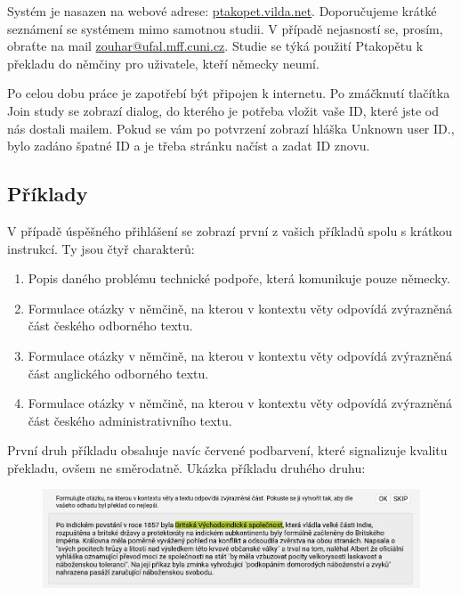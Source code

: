 Systém je nasazen na webové adrese: \href{https://ptakopet.vilda.net/}{ptakopet.vilda.net}. Doporučujeme krátké seznámení se systémem mimo samotnou studii. V případě nejasností se, prosím, obraťte na mail \href{mailto:zouhar@ufal.mff.cuni.cz}{zouhar@ufal.mff.cuni.cz}. Studie se týká použití Ptakopětu k překladu do němčiny pro uživatele, kteří německy neumí.

Po celou dobu práce je zapotřebí být připojen k internetu. Po zmáčknutí tlačítka Join study se zobrazí dialog, do kterého je potřeba vložit vaše ID, které jste od nás dostali mailem. Pokud se vám po potvrzení zobrazí hláška Unknown user ID., bylo zadáno špatné ID a je třeba stránku načíst a zadat ID znovu.

\pagebreak

\subsection*{Příklady}

V případě úspěšného přihlášení se zobrazí první z vašich příkladů spolu s krátkou instrukcí. Ty jsou čtyř charakterů:

\begin{enumerate}
    \item Popis daného problému technické podpoře, která komunikuje pouze německy.
    \item Formulace otázky v němčině, na kterou v kontextu věty odpovídá zvýrazněná část českého odborného textu.
    \item Formulace otázky v němčině, na kterou v kontextu věty odpovídá zvýrazněná část anglického odborného textu.
    \item Formulace otázky v němčině, na kterou v kontextu věty odpovídá zvýrazněná část českého administrativního textu.
\end{enumerate}

První druh příkladu obsahuje navíc červené podbarvení, které signalizuje kvalitu překladu, ovšem ne směrodatně. Ukázka příkladu druhého druhu:

\begin{figure}[H]
  \centering
  \includegraphics[width=\textwidth]{img/instructions/stimuli.png}
\end{figure}

